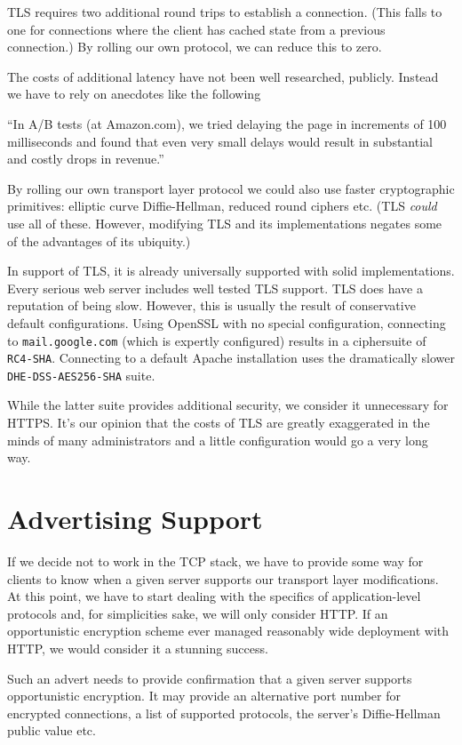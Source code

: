 \documentclass[conference]{IEEEtran}
\begin{document}
TLS requires two additional round trips to establish a connection. (This falls
to one for connections where the client has cached state from a previous
connection.) By rolling our own protocol, we can reduce this to zero.

The costs of additional latency have not been well researched, publicly.
Instead we have to rely on anecdotes like the following

  ``In A/B tests (at Amazon.com), we tried delaying the page in increments of
  100 milliseconds and found that even very small delays would result in
  substantial and costly drops in revenue.''\cite{latency}

By rolling our own transport layer protocol we could also use faster
cryptographic primitives: elliptic curve Diffie-Hellman, reduced round ciphers
etc. (TLS {\it could} use all of these. However, modifying TLS and its
implementations negates some of the advantages of its ubiquity.)

In support of TLS, it is already universally supported with solid
implementations. Every serious web server includes well tested TLS support. TLS
does have a reputation of being slow. However, this is usually the result of
conservative default configurations. Using OpenSSL with no special
configuration, connecting to {\tt mail.google.com} (which is expertly
configured) results in a ciphersuite of {\tt RC4-SHA}. Connecting to
a default Apache installation uses the dramatically slower {\tt
DHE-DSS-AES256-SHA} suite.

While the latter suite provides additional security, we consider it
unnecessary for HTTPS. It's our opinion that the costs of
TLS are greatly exaggerated in the minds of many administrators and a little
configuration would go a very long way.

\section{Advertising Support}

If we decide not to work in the TCP stack, we have to provide some way for
clients to know when a given server supports our transport layer modifications.
At this point, we have to start dealing with the specifics of application-level
protocols and, for simplicities sake, we will only consider HTTP. If an
opportunistic encryption
scheme ever managed reasonably wide deployment with HTTP, we would consider it
a stunning success.

Such an advert needs to provide confirmation that a given server supports
opportunistic encryption. It may provide an alternative port number for
encrypted connections, a list of supported protocols, the server's
Diffie-Hellman public value etc.
\end{document}

